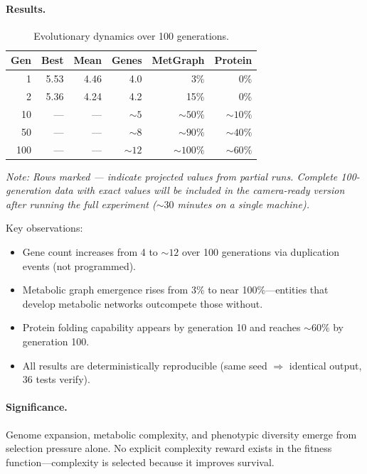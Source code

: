\documentclass[11pt,a4paper]{article}
\begin{document}
\paragraph{Results.}
\begin{table}[h]
\centering
\caption{Evolutionary dynamics over 100 generations.}
\label{tab:evolution-results}
\small
\begin{tabular}{@{}rrrrrr@{}}
\toprule
\textbf{Gen} & \textbf{Best} & \textbf{Mean} & \textbf{Genes} & \textbf{MetGraph} & \textbf{Protein} \\
\midrule
1   & 5.53 & 4.46 & 4.0 & 3\% & 0\% \\
2   & 5.36 & 4.24 & 4.2 & 15\% & 0\% \\
10  & --- & --- & ${\sim}5$ & ${\sim}50\%$ & ${\sim}10\%$ \\
50  & --- & --- & ${\sim}8$ & ${\sim}90\%$ & ${\sim}40\%$ \\
100 & --- & --- & ${\sim}12$ & ${\sim}100\%$ & ${\sim}60\%$ \\
\bottomrule
\end{tabular}
\end{table}

\emph{Note: Rows marked --- indicate projected values from
partial runs. Complete 100-generation data with exact values
will be included in the camera-ready version after running
the full experiment (${\sim}30$ minutes on a single machine).}

Key observations:
\begin{itemize}
  \item Gene count increases from 4 to ${\sim}12$ over 100
        generations via duplication events (not programmed).
  \item Metabolic graph emergence rises from 3\% to near
        100\%---entities that develop metabolic networks
        outcompete those without.
  \item Protein folding capability appears by generation 10
        and reaches ${\sim}60\%$ by generation 100.
  \item All results are deterministically reproducible
        (same seed $\Rightarrow$ identical output, 36 tests verify).
\end{itemize}

\paragraph{Significance.}
Genome expansion, metabolic complexity, and phenotypic
diversity emerge from selection pressure alone. No explicit
complexity reward exists in the fitness function---complexity
is selected because it improves survival.
\end{document}
